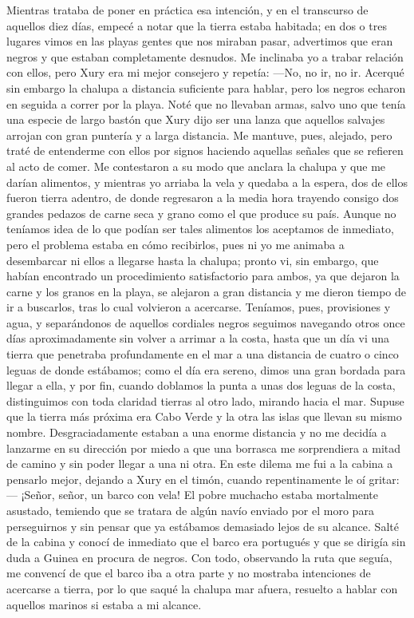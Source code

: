 \documentclass{novela}
\begin{document}
    Mientras trataba de poner en práctica esa intención, y en el transcurso de aquellos diez días, empecé a notar que la tierra estaba habitada; en dos o tres lugares vimos en las playas gentes que nos miraban pasar, advertimos que eran negros y que estaban completamente desnudos. Me inclinaba yo a trabar relación con ellos, pero Xury era mi mejor consejero y repetía:
    —No, no ir, no ir.
    Acerqué sin embargo la chalupa a distancia suficiente para hablar, pero los negros echaron en seguida a correr por la playa. Noté que no llevaban armas, salvo uno que tenía una especie de largo bastón que Xury dijo ser una lanza que aquellos salvajes arrojan con gran puntería y a larga distancia. Me mantuve, pues, alejado, pero traté de entenderme con ellos por signos haciendo aquellas señales que se refieren al acto de comer. Me contestaron a su modo que anclara la chalupa y que me darían alimentos, y mientras yo arriaba la vela y quedaba a la espera, dos de ellos fueron tierra adentro, de donde regresaron a la media hora trayendo consigo dos grandes pedazos de carne seca y grano como el que produce su país.
    Aunque no teníamos idea de lo que podían ser tales alimentos los aceptamos de inmediato, pero el problema estaba en cómo recibirlos, pues ni yo me animaba a desembarcar ni ellos a llegarse hasta la chalupa; pronto vi, sin embargo, que habían encontrado un procedimiento satisfactorio para ambos, ya que dejaron la carne y los granos en la playa, se alejaron a gran distancia y me dieron tiempo de ir a buscarlos, tras lo cual volvieron a acercarse.
    Teníamos, pues, provisiones y agua, y separándonos de aquellos cordiales negros seguimos navegando otros once días aproximadamente sin volver a arrimar a la costa, hasta que un día vi una tierra que penetraba profundamente en el mar a una distancia de cuatro o cinco leguas de donde estábamos; como el día era sereno, dimos una gran bordada para llegar a ella, y por fin, cuando doblamos la punta a unas dos leguas de la costa, distinguimos con toda claridad tierras al otro lado, mirando hacia el mar. Supuse que la tierra más próxima era Cabo Verde y la otra las islas que llevan su mismo nombre. Desgraciadamente estaban a una enorme distancia y no me decidía a lanzarme en su dirección por miedo a que una borrasca me sorprendiera a mitad de camino y sin poder llegar a una ni otra.
    En este dilema me fui a la cabina a pensarlo mejor, dejando a Xury en el timón, cuando repentinamente le oí gritar:
    — ¡Señor, señor, un barco con vela!
    El pobre muchacho estaba mortalmente asustado, temiendo que se tratara de algún navío enviado por el moro para perseguirnos y sin pensar que ya estábamos demasiado lejos de su alcance. Salté de la cabina y conocí de inmediato que el barco era portugués y que se dirigía sin duda a Guinea en procura de negros. Con todo, observando la ruta que seguía, me convencí de que el barco iba a otra parte y no mostraba intenciones de acercarse a tierra, por lo que saqué la chalupa mar afuera, resuelto a hablar con aquellos marinos si estaba a mi alcance.
\end{document}
